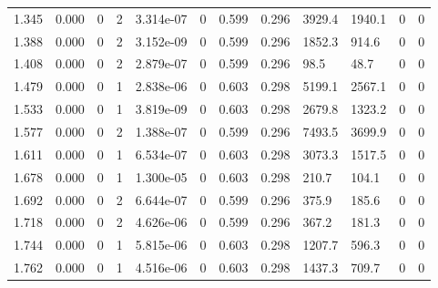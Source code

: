 \documentclass[preview]{standalone}
\begin{document}
{{\begin{tabular}{L{1.2cm}C{1.2cm} C{0.3cm}C{0.5cm} C{1.4cm}C{1.4cm} C{1.4cm}C{1.4cm} C{1.6cm}C{1.6cm} C{1.6cm}C{1.6cm}}
  1.345  &  0.000  & 0     &  2 &  3.314e-07  & 0  &  0.599&   0.296& 3929.4 & 1940.1   &  0 & 0  \\ 
  1.388  &  0.000  & 0     &  2 &  3.152e-09  & 0  &  0.599&   0.296& 1852.3 & 914.6   &  0 & 0  \\ 
  1.408  &  0.000  & 0     &  2 &  2.879e-07  & 0  &  0.599&   0.296& 98.5 & 48.7   &  0 & 0  \\ 
  1.479  &  0.000  & 0     &  1 &  2.838e-06  & 0  &  0.603&   0.298& 5199.1 & 2567.1   &  0 & 0  \\ 
  1.533  &  0.000  & 0     &  1 &  3.819e-09  & 0  &  0.603&   0.298& 2679.8 & 1323.2   &  0 & 0  \\ 
  1.577  &  0.000  & 0     &  2 &  1.388e-07  & 0  &  0.599&   0.296& 7493.5 & 3699.9   &  0 & 0  \\ 
  1.611  &  0.000  & 0     &  1 &  6.534e-07  & 0  &  0.603&   0.298& 3073.3 & 1517.5   &  0 & 0  \\ 
  1.678  &  0.000  & 0     &  1 &  1.300e-05  & 0  &  0.603&   0.298& 210.7 & 104.1   &  0 & 0  \\ 
  1.692  &  0.000  & 0     &  2 &  6.644e-07  & 0  &  0.599&   0.296& 375.9 & 185.6   &  0 & 0  \\ 
  1.718  &  0.000  & 0     &  2 &  4.626e-06  & 0  &  0.599&   0.296& 367.2 & 181.3   &  0 & 0  \\ 
  1.744  &  0.000  & 0     &  1 &  5.815e-06  & 0  &  0.603&   0.298& 1207.7 & 596.3   &  0 & 0  \\ 
  1.762  &  0.000  & 0     &  1 &  4.516e-06  & 0  &  0.603&   0.298& 1437.3 & 709.7   &  0 & 0  \\ 
\hline 
\end{tabular} 

}}
\end{document}
